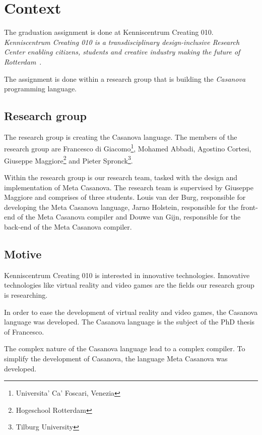 \section{Context}\label{context}
The graduation assignment is done at Kenniscentrum Creating 010.
\textit{Kenniscentrum Creating 010 is a transdisciplinary design-inclusive Research Center enabling citizens, students and creative industry making the future of Rotterdam}~\cite{creating2016home}.

The assignment is done within a research group that is building the \textit{Casanova} programming language.

\subsection{Research group}
The research group is creating the Casanova language.
The members of the research group are 
  Francesco di Giacomo\footnote{\label{venice}Universita' Ca' Foscari, Venezia}, 
  Mohamed Abbadi, 
  Agostino Cortesi, 
  Giuseppe Maggiore\footnote{Hogeschool Rotterdam} and 
  Pieter Spronck\footnote{Tilburg University}.

Within the research group is our research team, tasked with the design and implementation of Meta Casanova.
The research team is supervised by Giuseppe Maggiore and comprises of three students.
Louis van der Burg, responsible for developing the Meta Casanova language,
Jarno Holstein, responsible for the front-end of the Meta Casanova compiler
and Douwe van Gijn, responsible for the back-end of the Meta Casanova compiler.

\subsection{Motive}\label{motive}
Kenniscentrum Creating 010 is interested in innovative technologies.
Innovative technologies like virtual reality and video games are the fields our research group is researching.

In order to ease the development of virtual reality and video games, the Casanova language was developed.
The Casanova language is the subject of the PhD thesis of Francesco.

The complex nature of the Casanova language lead to a complex compiler.
To simplify the development of Casanova, the language Meta Casanova was developed.


